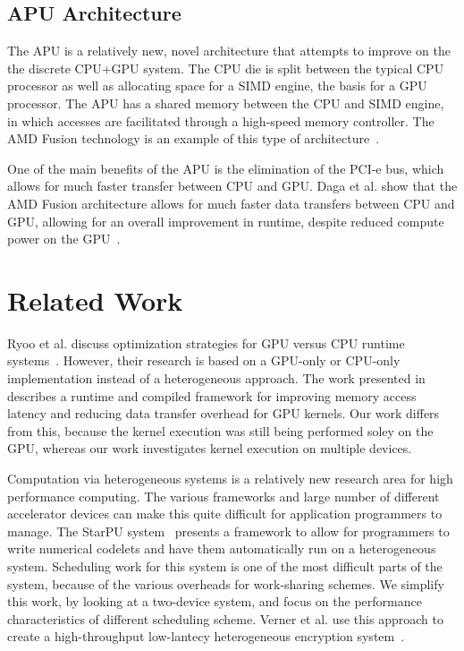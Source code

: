 \documentclass[journal]{IEEEtran}
\begin{document}
\subsection{APU Architecture}
The APU is a relatively new, novel architecture that attempts to 
improve on the the discrete CPU+GPU system.  The CPU die is split
between the typical CPU processor as well as allocating space
for a SIMD engine, the basis for a GPU processor.  The APU has a 
shared memory between the CPU and SIMD engine, in which accesses
are facilitated through a high-speed memory controller.  The AMD
Fusion technology is an example of this type of architecture~\cite{AMDFusion}.

One of the main benefits of the APU is the elimination of the PCI-e
bus, which allows for much faster transfer between CPU and GPU.  Daga et al.
show that the AMD Fusion architecture allows for much faster data transfers
between CPU and GPU, allowing for an overall improvement in runtime, despite
reduced compute power on the GPU~\cite{Daga2011}. 

\section{Related Work}
Ryoo et al. discuss optimization strategies for GPU versus CPU runtime
systems~\cite{Ryoo2007}.  However, their research is based on a GPU-only
or CPU-only implementation instead of a heterogeneous approach.  The work
presented in ~\cite{Jablin2011} describes a runtime and compiled framework
for improving memory access latency and reducing data transfer overhead
for GPU kernels.  Our work differs from this, because the kernel execution
was still being performed soley on the GPU, whereas our work investigates
kernel execution on multiple devices.

Computation via heterogeneous systems is a relatively new research area for
high performance computing.  The various frameworks and large number of
different accelerator devices can make this quite difficult for application
programmers to manage.  The StarPU system~\cite{Augonnet2009} presents a 
framework to allow for programmers to write numerical codelets and have them
automatically run on a heterogeneous system.  Scheduling work for this system
is one of the most difficult parts of the system, because of the various
overheads for work-sharing schemes. We simplify this work, by looking at a
two-device system, and focus on the performance characteristics of different
scheduling scheme.  Verner et al. use this approach to create a high-throughput
low-lantecy heterogeneous encryption system~\cite{Verner2011}. 
\end{document}
